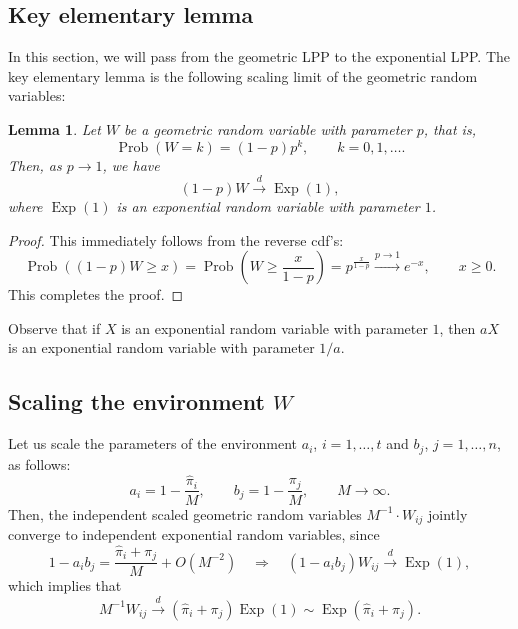 \documentclass[letterpaper,11pt,oneside,reqno]{book}
\numberwithin{equation}{chapter}  %
\newtheorem{lemma}[proposition]{Lemma}
\theoremstyle{definition}
\begin{document}
\subsection{Key elementary lemma}

In this section, we will pass from the geometric LPP to the exponential LPP. The
key elementary lemma is the following scaling limit of the geometric random variables:
\begin{lemma}
	\label{lecture14:lemma:scaling_limit}
	Let $W$ be
	a geometric random variable with parameter $p$,
	that is,
	\begin{equation*}
		\operatorname{Prob}(W=k)=(1-p)p^k,\qquad k=0,1,\ldots.
	\end{equation*}
	Then, as $p \to 1$, we have
	\begin{equation}
		\label{lecture14:eq:scaling_limit}
		(1-p)W \xrightarrow{d} \operatorname{Exp}(1),
	\end{equation}
	where $\operatorname{Exp}(1)$ is an exponential random variable with parameter $1$.
\end{lemma}
\begin{proof}
	This immediately follows from
	the reverse cdf's:
	\begin{equation*}
		\operatorname{Prob}( (1-p)W \geq x ) = \operatorname{Prob}(W \geq \frac{x}{1-p}) =  p^{\frac{x}{1-p}}
		\xrightarrow{p \to 1}  e^{-x},\qquad  x\geq 0.
	\end{equation*}
	This completes the proof.
\end{proof}

Observe that if $X$ is an exponential random variable with parameter $1$, then
$a X$ is an exponential random variable with parameter $1/a$.

\subsection{Scaling the environment \texorpdfstring{$W$}{W}}

Let us scale the parameters of the environment $a_i$, $i=1,\ldots,t$ and $b_j$, $j=1,\ldots,n$,
as follows:
\begin{equation*}
	a_i=1-\frac{\hat \pi_i}{M}, \qquad b_j=1-\frac{\pi_j}{M},\qquad M\to\infty.
\end{equation*}
Then, the independent scaled geometric random variables $M^{-1}\cdot W_{ij}$
jointly converge to independent exponential random variables, since
\begin{equation*}
	1-a_ib_j=\frac{\hat \pi_i+\pi_j}{M}+O(M^{-2})\quad \Rightarrow\quad
	(1-a_i b_j)W_{ij} \xrightarrow{d} \operatorname{Exp}(1),
\end{equation*}
which implies that
\begin{equation*}
	M^{-1}W_{ij} \xrightarrow{d} (\hat \pi_i+\pi_j)\operatorname{Exp}(1)\sim \operatorname{Exp}(\hat \pi_i+\pi_j).
\end{equation*}
\end{document}
